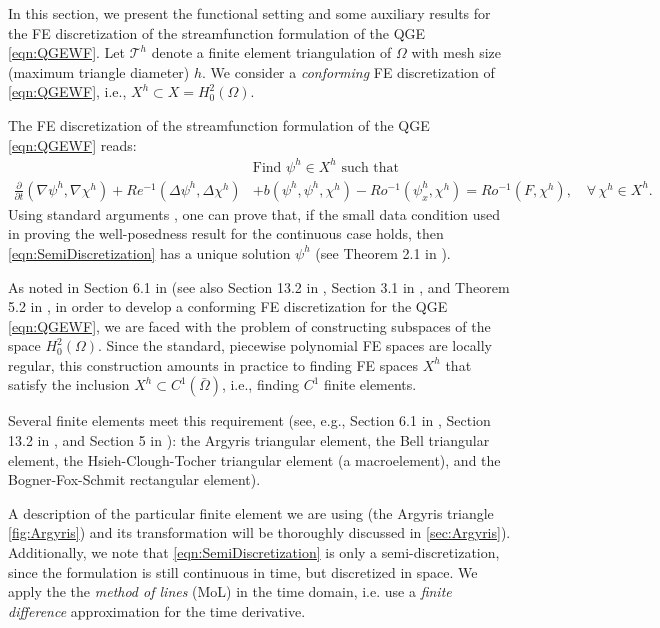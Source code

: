 In this section, we present the functional setting and some auxiliary results
for the FE discretization of the streamfunction formulation of the QGE
\eqref{eqn:QGEWF}. Let $\mathcal{T}^h$ denote a finite element triangulation of
$\Omega$ with mesh size (maximum triangle diameter) $h$. We consider a
\emph{conforming} FE discretization of \eqref{eqn:QGEWF}, i.e., $X^h \subset X
= H_0^2(\Omega)$.

The FE discretization of the streamfunction formulation of the QGE
\eqref{eqn:QGEWF} reads:
\begin{equation}
  \begin{split}
    &\text{Find } \psi^h \in X^h \text{ such that} \\
    \frac{\partial}{\partial t} (\nabla \psi^h, \nabla \chi^h)
      + Re^{-1} (\Delta \psi^h, \Delta \chi^h)
      &+ b(\psi^h,\psi^h,\chi^h)
      - Ro^{-1} (\psi_x^h,\chi^h)
      = Ro^{-1}(F,\chi^h),\quad \forall \, \chi^h \in X^h.
    \label{eqn:SemiDiscretization}
  \end{split}
\end{equation}
Using standard arguments \cite{Girault79,Girault86}, one can prove that, if the
small data condition used in proving the well-posedness result for the
continuous case holds, then \eqref{eqn:SemiDiscretization} has a unique solution
$\psi^h$ (see Theorem 2.1 in \cite{Cayco86}).

As noted in Section 6.1 in \cite{Ciarlet} (see also Section 13.2 in
\cite{Gunzburger89}, Section 3.1 in \cite{Johnson}, and Theorem 5.2 in
\cite{Braess}, in order to develop a conforming FE discretization for the QGE
\eqref{eqn:QGEWF}, we are faced with the problem of constructing subspaces of
the space $H^2_0(\Omega)$. Since the standard, piecewise polynomial FE spaces
are locally regular, this construction amounts in practice to finding FE spaces
$X^h$ that satisfy the inclusion $X^h \subset C^1({\bar \Omega})$, i.e., finding
$C^1$ finite elements.

Several finite elements meet this requirement (see, e.g., Section 6.1 in
\cite{Ciarlet}, Section 13.2 in \cite{Gunzburger89}, and Section 5 in
\cite{Braess}): the Argyris triangular element, the Bell triangular element, the
Hsieh-Clough-Tocher triangular element (a macroelement), and the
Bogner-Fox-Schmit rectangular element).

A description of the particular finite element we are using (the Argyris
triangle \autoref{fig:Argyris}) and its transformation will be thoroughly
discussed in \autoref{sec:Argyris}). Additionally, we note that
\eqref{eqn:SemiDiscretization} is only a semi-discretization, since the
formulation is still continuous in time, but discretized in space.  We apply the
the \emph{method of lines} (MoL) in the time domain, i.e. use a \emph{finite
difference} approximation for the time derivative.

